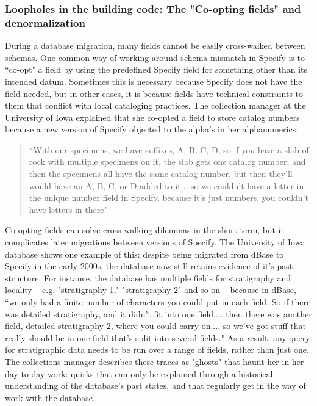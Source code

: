 \subsubsection{Loopholes in the building code: The "Co-opting fields" and denormalization }

During a database migration, many fields cannot be easily cross-walked between schemas. One common way of working around schema mismatch in Specify is to “co-opt" a field by using the predefined Specify field for something other than its intended datum. Sometimes this is necessary because Specify does not have the field needed, but in other cases, it is because fields have technical constraints to them that conflict with local cataloging practices. The collection manager at the University of Iowa explained that she co-opted a field to store catalog numbers because a new version of Specify objected to the alpha’s in her alphanumerics:
\begin{quote}
“With our specimens, we have suffixes, A, B, C, D, so if you have a slab of rock with multiple specimens on it, the slab gets one catalog number, and then the specimens all have the same catalog number, but then they'll would have an A, B, C, or D added to it... so we couldn't have a letter in the unique number field in Specify, because it's just numbers, you couldn't have letters in there"
\end{quote}

Co-opting fields can solve cross-walking dilemmas in the short-term, but it complicates later migrations between versions of Specify. The University of Iowa database shows one example of this: despite being migrated from dBase to Specify in the early 2000s, the database now still retains evidence of it's past structure. For instance, the database has multiple fields for stratigraphy and locality -- e.g. "stratigraphy 1," "stratigraphy 2" and so on -- because in dBase, “we only had a finite number of characters you could put in each field. So if there was detailed stratigraphy, and it didn't fit into one field.... then there was another field, detailed stratigraphy 2, where you could carry on.... so we've got stuff that really should be in one field that's split into several fields."
As a result, any query for stratigraphic data needs to be run over a range of fields, rather than just one. The collections manager describes these traces as "ghosts" that haunt her in her day-to-day work: quirks that can only be explained through a historical understanding of the database's past states, and that regularly get in the way of work with the database.

